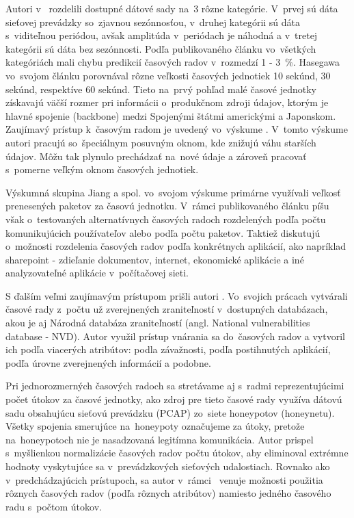\documentclass[thesismargins, thesislinespacing, openright, upjsfrontpage]{rnthesis}
\begin{document}
Autori v~\cite{cortez2012multi} rozdelili dostupné dátové sady na~3 rôzne kategórie. V~prvej sú dáta sieťovej prevádzky so~zjavnou sezónnosťou, v~druhej kategórii sú dáta s~viditeľnou periódou, avšak amplitúda v~periódach je náhodná a v~tretej kategórii sú dáta bez sezónnosti. Podľa publikovaného článku vo~všetkých kategóriách mali chybu predikcií časových radov v~rozmedzí 1 - 3~\%. Hasegawa vo~svojom článku \cite{hasegawa2001applications} porovnával rôzne veľkosti časových jednotiek 10 sekúnd, 30 sekúnd, respektíve 60 sekúnd. Tieto na~prvý pohľad malé časové jednotky získavajú väčší rozmer pri informácii o~produkčnom zdroji údajov, ktorým je hlavné spojenie (backbone) medzi Spojenými štátmi americkými a Japonskom. Zaujímavý prístup k~časovým radom je uvedený vo~výskume \cite{papagiannaki2005long}. V~tomto výskume autori pracujú so~špeciálnym posuvným oknom, kde znižujú váhu starších údajov. Môžu tak plynulo prechádzať na~nové údaje a zároveň pracovať s~pomerne veľkým oknom časových jednotiek.

Výskumná skupina Jiang a spol. vo~svojom výskume \cite{jiang2004detecting}  primárne využívali veľkosť prenesených paketov za časovú jednotku. V~rámci publikovaného článku píšu však o~testovaných alternatívnych časových radoch rozdelených podľa počtu komunikujúcich používateľov alebo podľa počtu paketov. Taktiež diskutujú o~možnosti rozdelenia časových radov podľa konkrétnych aplikácií, ako napríklad sharepoint - zdieľanie dokumentov, internet, ekonomické aplikácie a iné analyzovateľné aplikácie v~počítačovej sieti.

S ďalším veľmi zaujímavým prístupom prišli autori \cite{tang2016exploiting,roumani2015time,tang2018disclosure,tang2017big,pokhrel2017cybersecurity,werner2017time}. Vo~svojich prácach vytvárali časové rady z~počtu už zverejnených zraniteľností v~dostupných databázach, akou je aj Národná databáza zraniteľností (angl. National vulnerabilities database - NVD). Autor \cite{roumani2015time} využil prístup vnárania sa do~časových radov a vytvoril ich podľa viacerých atribútov: podla závažnosti, podľa postihnutých aplikácií, podľa úrovne zverejnených informácií a podobne.

Pri jednorozmerných časových radoch sa stretávame aj s~radmi reprezentujúcimi počet útokov za časové jednotky, \cite{zhan2015predicting} ako zdroj pre tieto časové rady využíva dátovú sadu obsahujúcu sieťovú prevádzku (PCAP) zo~siete honeypotov (honeynetu). Všetky spojenia smerujúce na~honeypoty označujeme za útoky, pretože na~honeypotoch nie je nasadzovaná legitímna komunikácia. Autor \cite{fang2019deep} prispel s~myšlienkou normalizácie časových radov počtu útokov, aby eliminoval extrémne hodnoty vyskytujúce sa v~prevádzkových sieťových udalostiach. Rovnako ako v~predchádzajúcich prístupoch, sa autor v~rámci~\cite{condon2008analysis} venuje možnosti použitia rôznych časových radov (podľa rôznych atribútov) namiesto jedného časového radu s~počtom útokov.
\end{document}
